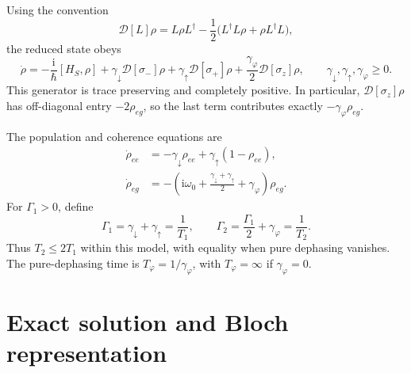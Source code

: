 \documentclass[10pt,a4paper]{article}
\newcommand{\D}{\mathcal{D}}
\newcommand{\ii}{\mathrm{i}}
\begin{document}
Using the convention
\begin{equation}
 \D[L]\rho=L\rho L^\dagger-
 \frac{1}{2}\bigl(L^\dagger L\rho+\rho L^\dagger L\bigr),
 \label{eq:dissipator}
\end{equation}
the reduced state obeys
\begin{equation}
 \dot\rho=-\frac{\ii}{\hbar}[H_S,\rho]
 +\gamma_\downarrow\D[\sigma_-]\rho
 +\gamma_\uparrow\D[\sigma_+]\rho
 +\frac{\gamma_\varphi}{2}\D[\sigma_z]\rho,
 \qquad \gamma_\downarrow,\gamma_\uparrow,\gamma_\varphi\geq0.
 \label{eq:lindblad}
\end{equation}
This generator is trace preserving and completely positive. In particular,
$\D[\sigma_z]\rho$ has off-diagonal entry $-2\rho_{eg}$, so the last
term contributes exactly $-\gamma_\varphi\rho_{eg}$.

The population and coherence equations are
\begin{align}
 \dot\rho_{ee}&=-\gamma_\downarrow\rho_{ee}
                  +\gamma_\uparrow(1-\rho_{ee}),
                  \label{eq:population}\\
 \dot\rho_{eg}&=-\left(\ii\omega_0+
 \frac{\gamma_\downarrow+\gamma_\uparrow}{2}
 +\gamma_\varphi\right)\rho_{eg}.
 \label{eq:coherence}
\end{align}
For $\Gamma_1>0$, define
\begin{equation}
 \Gamma_1=\gamma_\downarrow+\gamma_\uparrow=\frac{1}{T_1},
 \qquad
 \Gamma_2=\frac{\Gamma_1}{2}+\gamma_\varphi=\frac{1}{T_2}.
 \label{eq:rates}
\end{equation}
Thus $T_2\leq2T_1$ within this model, with equality when pure dephasing
vanishes. The pure-dephasing time is $T_\varphi=1/\gamma_\varphi$, with
$T_\varphi=\infty$ if $\gamma_\varphi=0$.

\section{Exact solution and Bloch representation}
\end{document}
